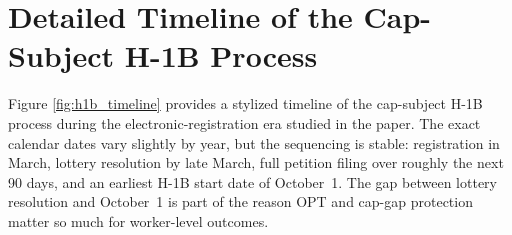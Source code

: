 \clearpage
\section{Detailed Timeline of the Cap-Subject H-1B Process}
\label{sec:appendix_context}

Figure \ref{fig:h1b_timeline} provides a stylized timeline of the cap-subject H-1B process during the electronic-registration era studied in the paper. The exact calendar dates vary slightly by year, but the sequencing is stable: registration in March, lottery resolution by late March, full petition filing over roughly the next 90 days, and an earliest H-1B start date of October~1. The gap between lottery resolution and October~1 is part of the reason OPT and cap-gap protection matter so much for worker-level outcomes.

